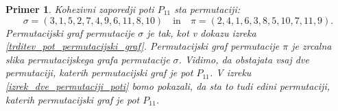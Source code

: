 \documentclass[a4paper, 12pt]{book}
\newtheorem{primer}{Primer}[chapter]
\begin{document}
\begin{primer}
Kohezivni zaporedji poti $P_{11}$ sta permutaciji:
\[
    \sigma = (3, 1, 5, 2, 7, 4, 9, 6, 11, 8, 10) \quad \text{in} \quad \pi = (2, 4, 1, 6, 3, 8, 5, 10, 7, 11, 9). 
\]
Permutacijski graf permutacije $\sigma$ je tak, kot v dokazu izreka \ref{trditev_pot_permutacijski_graf}. Permutacijski graf permutacije $\pi$ je zrcalna slika permutacijskega grafa permutacije $\sigma$.
Vidimo, da obstajata vsaj dve permutaciji, katerih permutacijski graf je pot $P_{11}$. V izreku \ref{izrek_dve_permutaciji_poti} bomo pokazali, da sta to tudi edini permutaciji, katerih permutacijski graf je pot $P_{11}$.
\end{primer}





\end{document}
